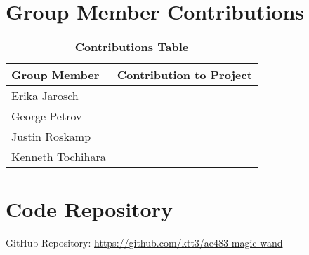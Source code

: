 \appendix

\section{Group Member Contributions} \label{apx:contributions}
    \begin{table}[H]
        \begin{center}
        \caption{\textbf{Contributions Table}}
        \begin{tabular}{ | p{2in} | p{4in}| } 
            \hline
            \textbf{Group Member} & \textbf{Contribution to Project} \\  \hline
            Erika Jarosch & \\ \hline
            George Petrov & \\ \hline
            Justin Roskamp & \\ \hline
            Kenneth Tochihara & \\ \hline
        \end{tabular}
        \end{center}
    \end{table}

\section{Code Repository}
    GitHub Repository: \url{https://github.com/ktt3/ae483-magic-wand}
